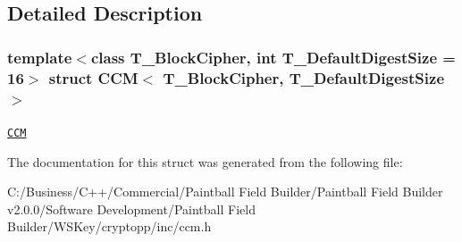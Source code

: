 \subsection{Detailed Description}
\subsubsection*{template$<$class T\_\-BlockCipher, int T\_\-DefaultDigestSize = 16$>$ struct CCM$<$ T\_\-BlockCipher, T\_\-DefaultDigestSize $>$}

\href{http://www.cryptolounge.org/wiki/CCM}{\tt CCM} 

The documentation for this struct was generated from the following file:\begin{DoxyCompactItemize}
\item 
C:/Business/C++/Commercial/Paintball Field Builder/Paintball Field Builder v2.0.0/Software Development/Paintball Field Builder/WSKey/cryptopp/inc/ccm.h\end{DoxyCompactItemize}
